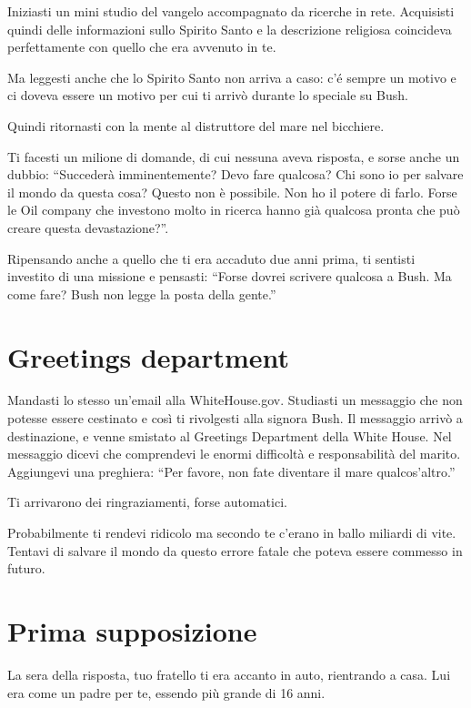 Iniziasti un mini studio del vangelo accompagnato da ricerche in rete. Acquisisti quindi delle informazioni sullo Spirito Santo e la descrizione religiosa coincideva perfettamente con quello che era avvenuto in te.

Ma leggesti anche che lo Spirito Santo non arriva a caso: c'é sempre un motivo e ci doveva essere un motivo per cui ti arrivò durante lo speciale su Bush.

Quindi ritornasti con la mente al distruttore del mare nel bicchiere.

Ti facesti un milione di domande, di cui nessuna aveva risposta, e sorse anche un dubbio: ``Succederà imminentemente? Devo fare qualcosa? Chi sono io per salvare il mondo da questa cosa? Questo non è possibile. Non ho il potere di farlo. Forse le Oil company che investono molto in ricerca hanno già qualcosa pronta che può creare questa devastazione?''.

Ripensando anche a quello che ti era accaduto due anni prima, ti sentisti investito di una missione e pensasti: ``Forse dovrei scrivere qualcosa a Bush. Ma come fare? Bush non legge la posta della gente.''

\section{Greetings department}
\label{greetings}

Mandasti lo stesso un'email alla WhiteHouse.gov. Studiasti un messaggio che non potesse essere cestinato e così ti rivolgesti alla signora Bush. Il messaggio arrivò a destinazione, e venne smistato al Greetings Department della White House. Nel messaggio dicevi che comprendevi le enormi difficoltà e responsabilità del marito. Aggiungevi una preghiera: “Per favore, non fate diventare il mare qualcos'altro.”

Ti arrivarono dei ringraziamenti, forse automatici.

Probabilmente ti rendevi ridicolo ma secondo te c'erano in ballo miliardi di vite. Tentavi di salvare il mondo da questo errore fatale che poteva essere commesso in futuro.

\section{Prima supposizione}
\label{prima supposizione}

La sera della risposta, tuo fratello ti era accanto in auto, rientrando a casa. Lui era come un padre per te, essendo più grande di 16 anni.

